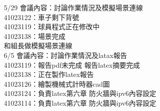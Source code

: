 5/29 會議內容：討論作業情況及模擬場景連線\\
41023122：車子剩下背號\\
41023119：球員程式正在修改中\\
41023138：場景完成\\
和組長做模擬場景連線\\

6/5 會議內容：討論作業情況及latax報告\\
41023119：報告pdf未完成 報告latex摘要完成\\
41023138：正在製作latex報告\\
41023126：繪製機械式計時器cad圖\\
41023124：負責latex第六章 防火牆與ipv6內容設定\\
41023114：負責latex第六章 防火牆與ipv6內容設定\\
\newpage

\renewcommand{\baselinestretch}{1.0} %